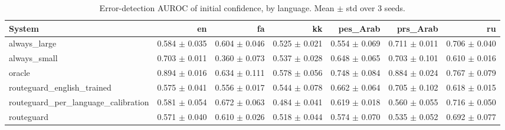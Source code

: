 \begin{table}[t]
\centering
\small
\caption{Error-detection AUROC of initial confidence, by language. Mean $\pm$ std over 3 seeds.}
\label{tab:language_reliability}
\begin{tabular}{lrrrrrr}
\toprule
System & en & fa & kk & pes\_Arab & prs\_Arab & ru \\
\midrule
always\_large & 0.584 $\pm$ 0.035 & 0.604 $\pm$ 0.046 & 0.525 $\pm$ 0.021 & 0.554 $\pm$ 0.069 & 0.711 $\pm$ 0.011 & 0.706 $\pm$ 0.040 \\
always\_small & 0.703 $\pm$ 0.011 & 0.360 $\pm$ 0.073 & 0.537 $\pm$ 0.028 & 0.648 $\pm$ 0.065 & 0.703 $\pm$ 0.101 & 0.610 $\pm$ 0.016 \\
oracle & 0.894 $\pm$ 0.016 & 0.634 $\pm$ 0.111 & 0.578 $\pm$ 0.056 & 0.748 $\pm$ 0.084 & 0.884 $\pm$ 0.024 & 0.767 $\pm$ 0.079 \\
routeguard\_english\_trained & 0.575 $\pm$ 0.041 & 0.556 $\pm$ 0.017 & 0.544 $\pm$ 0.078 & 0.662 $\pm$ 0.064 & 0.705 $\pm$ 0.102 & 0.618 $\pm$ 0.015 \\
routeguard\_per\_language\_calibration & 0.581 $\pm$ 0.054 & 0.672 $\pm$ 0.063 & 0.484 $\pm$ 0.041 & 0.619 $\pm$ 0.018 & 0.560 $\pm$ 0.055 & 0.716 $\pm$ 0.050 \\
routeguard & 0.571 $\pm$ 0.040 & 0.610 $\pm$ 0.026 & 0.518 $\pm$ 0.044 & 0.574 $\pm$ 0.070 & 0.535 $\pm$ 0.052 & 0.692 $\pm$ 0.077 \\
\bottomrule
\end{tabular}
\end{table}

